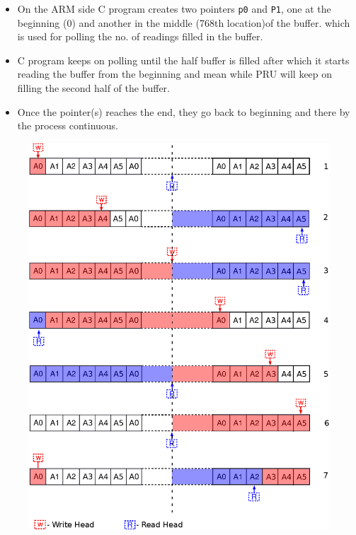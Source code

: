 \begin{itemize}
	\item On the ARM side C program creates two pointers \texttt{p0} and \texttt{P1}, one at the beginning (0) and another in the middle (768th location)of the buffer. which is used for polling the no. of readings filled in the buffer. 
	\item C program keeps on polling until the half buffer is filled after which it starts reading the buffer from the beginning and mean while PRU will keep on filling the second half of the buffer.
	\item Once the pointer(s) reaches the end, they go back to beginning and there by the process continuous.
\end{itemize}

\begin{figure}
	\includegraphics[width=\textwidth]{fig/ping_pong.eps}
\end{figure}
